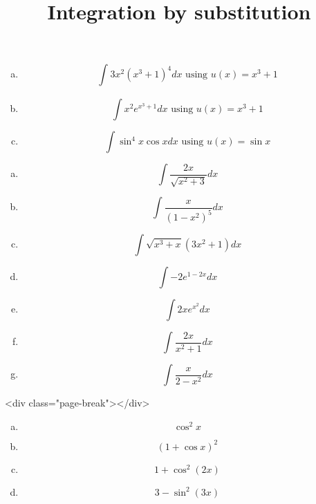 \documentclass[12pt]{article}
\begin{document}
\title{Integration by substitution}
\maketitle



 \n
{}

\begin{enumerate}[a) ]
\item $$ \int_{}3x^2(x^3+1)^4dx \text{ using } u(x)=x^3+1$$

\item
$$
\int x^2e^{x^3+1}dx \text{ using } u(x)=x^3+1
$$

\item
$$
\int \sin^4x\cos xdx \text{ using } u(x)=\sin x
$$
\end{enumerate}

\bigskip

\bigskip


 \n
{}

\begin{enumerate}[a) ]
\item
$$
\int{\frac{2x}{\sqrt{x^2+3 }}}dx
$$

\item
$$
\int \frac{x}{(1-x^2)^5}dx
$$

\item
$$
\int \sqrt{ x^3+x}(3x^2+1)dx
$$

\item
$$
\int-2e^{1-2x}dx
$$

\item
$$
\int{2xe^{x^2}}dx
$$

\item
$$
\int{\frac{2x}{x^2+1}}dx
$$

\item
$$
\int \frac{x}{2-x^2}dx
$$
\end{enumerate}

\newpage

<div class="page-break"></div>

 \n
{}

\begin{enumerate}[a) ]
\item 
$$
\cos^2x
$$

\item 
$$
(1+\cos x)^2
$$

\item 
$$
1+\cos^2(2x)
$$

\item 
$$
3-\sin^2(3x)
$$
\end{enumerate}
\end{document}
